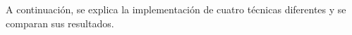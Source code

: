  A continuación, se explica la implementación de cuatro técnicas diferentes y se comparan sus resultados.